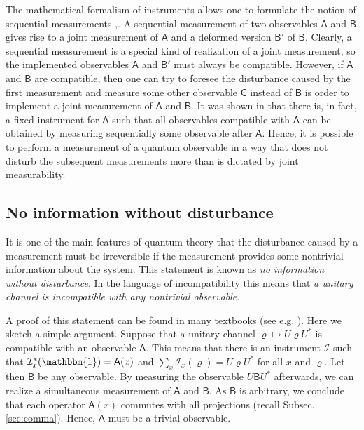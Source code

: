 \documentclass[12pt]{iopart}
\theoremstyle{definition}
\newcommand{\id}{\mathbbm{1}} %
\newcommand{\Ao}{\mathsf{A}}%
\newcommand{\Bo}{\mathsf{B}}%
\newcommand{\Co}{\mathsf{C}}%
\newcommand{\Ii}{\mathcal{I}}
\begin{document}
{The mathematical formalism of instruments allows one to formulate the notion of sequential measurements \cite{DaLe70},\cite{BuCaLa90}.
A sequential measurement of two observables $\Ao$ and $\Bo$ gives rise to a joint measurement of $\Ao$ and a deformed version $\Bo'$ of $\Bo$.
Clearly, a sequential measurement is a special kind of realization of a joint measurement, so the implemented observables $\Ao$ and $\Bo'$ must always be compatible. 
However, if  $\Ao$ and $\Bo$ are compatible, then one can try to foresee the disturbance caused by the first measurement and measure some other observable $\Co$ instead of $\Bo$ is order to implement a joint measurement of $\Ao$ and $\Bo$.
It was shown in \cite{HeMi15} that there is, in fact, a fixed instrument for $\Ao$ such that all observables compatible with $\Ao$ can be obtained by measuring sequentially some observable after $\Ao$. 
Hence, it is possible to perform a measurement of a quantum observable in a way that does not
disturb the subsequent measurements more than is dictated by joint measurability.

\subsection{No information without disturbance}\label{sec:no-info}

It is one of the main features of quantum theory that the disturbance
caused by a measurement must be irreversible if the measurement provides some nontrivial information about the system. This statement is known as \emph{no information without disturbance}. 
In the language of incompatibility this means that \emph{a unitary channel is incompatible with any nontrivial observable}. 

A proof of this statement can be found in many textbooks 
(see e.g. \cite{MLQT12}). Here we sketch a simple argument.  
Suppose that a unitary channel 
$\varrho \mapsto U \varrho U^*$ is compatible with an observable $\Ao$. 
This means that there is an instrument $\Ii$ such that 
$\Ii_x^*(\id)=\Ao(x)$ and $\sum_x \Ii_x(\varrho) = U\varrho U^*$ for all $x$ and $\varrho$. 
Let then $\Bo$ be any observable.
By measuring the observable $U\Bo U^*$ afterwards, 
we can realize a simultaneous measurement of $\Ao$ and $\Bo$.
As $\Bo$ is arbitrary, we conclude that each operator $\Ao(x)$ commutes with all projections (recall Subsec. \ref{sec:comma}).
Hence, $\Ao$ must be a trivial observable. 


}
\end{document}
